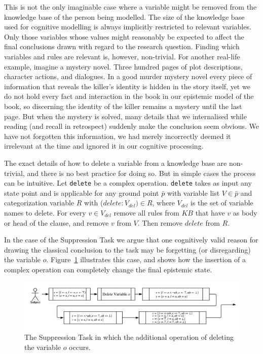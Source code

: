 \documentclass{article}
\begin{document}
This is not the only imaginable case where a variable might be removed from the knowledge base of the person being modelled. The size of the knowledge base used for cognitive modelling is always implicitly restricted to relevant variables. Only those variables whose values might reasonably be expected to affect the final conclusions drawn with regard to the research question. Finding which variables and rules are relevant is, however, non-trivial. For another real-life example, imagine a mystery novel. Three hundred pages of plot descriptions, character actions, and dialogues. In a good murder mystery novel every piece of information that reveals the killer's identity is hidden in the story itself, yet we do not hold every fact and interaction in the book in our epistemic model of the book, so discerning the identity of the killer remains a mystery until the last page. But when the mystery is solved, many details that we internalised while reading (and recall in retrospect) suddenly make the conclusion seem obvious. We have not forgotten this information, we had merely incorrectly deemed it irrelevant at the time and ignored it in our cognitive processing.

The exact details of how to delete a variable from a knowledge base are non-trivial, and there is no best practice for doing so. But in simple cases the process can be intuitive. Let \texttt{delete} be a complex operation. \texttt{delete} takes as input any state point and is applicable for any ground point $\bar{p}$ with variable list $V \in \bar{p}$ and categorization variable $R$ with ($delete:V_{del}) \in R$, where $V_{del}$ is the set of variable names to delete. For every $v \in V_{del}$ remove all rules from $KB$ that have $v$ as body or head of the clause, and remove $v$ from $V$. Then remove $delete$ from $R$.

In the case of the Suppression Task we argue that one cognitively valid reason for drawing the classical conclusion to the task may be forgetting (or disregarding) the variable $o$. Figure~\ref{fig:supmod} illustrates this case, and shows how the insertion of a complex operation can completely change the final epistemic state.

\begin{figure}
\begin{center}
\includegraphics[width=0.85\linewidth]{suppressionSCP_mod}
\end{center}

\caption{The Suppression Task in which the additional operation of deleting the variable $o$ occurs.}
\label{fig:supmod}
\end{figure}
\end{document}
